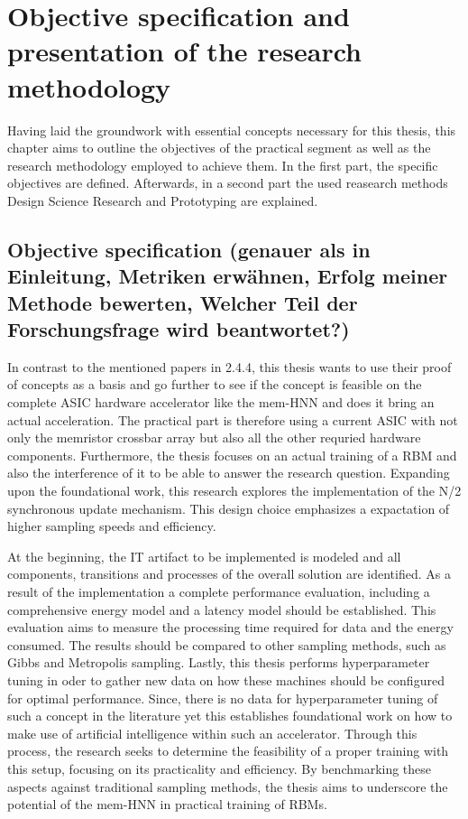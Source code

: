 \chapter{Objective specification and presentation of the research methodology}


Having laid the groundwork with essential concepts necessary for this thesis,
this chapter aims to outline the objectives of the practical segment as well as the research methodology employed to achieve them.
In the first part, the specific objectives are defined. 
Afterwards, in a second part the used reasearch methods Design Science Research and Prototyping are explained.






\section{Objective specification (genauer als in Einleitung, Metriken erwähnen, Erfolg meiner Methode bewerten, Welcher Teil der Forschungsfrage wird beantwortet?)}

In contrast to the mentioned papers in 2.4.4, this thesis wants to use their proof of concepts as a basis and go further to see if the concept
is feasible on the complete \ac{ASIC} hardware accelerator like the \ac{mem-HNN} and does it bring an actual acceleration.
The practical part is therefore using a current \ac{ASIC} with not only the memristor crossbar array but also all the other requried hardware components.
Furthermore, the thesis focuses on an actual training of a \ac{RBM} and also the interference of it to be able to answer the research question.
Expanding upon the foundational work, this research explores the implementation of the N/2 synchronous update mechanism.
This design choice emphasizes a expactation of higher sampling speeds and efficiency.

At the beginning, the \ac{IT} artifact to be implemented is modeled and all components, transitions and processes of the overall solution are identified.
As a result of the implementation a complete performance evaluation, including a comprehensive energy model and a latency model should be established.
This evaluation aims to measure the processing time required for data and the energy consumed.
The results should be compared to other sampling methods, such as Gibbs and Metropolis sampling.
Lastly, this thesis performs hyperparameter tuning in oder to gather new data on how these machines should be configured for optimal performance.
Since, there is no data for hyperparameter tuning of such a concept in the literature yet this establishes foundational work on how to make use of artificial intelligence within such an accelerator.
Through this process, the research seeks to determine the feasibility of a proper training with this setup, focusing on its practicality and efficiency.
By benchmarking these aspects against traditional sampling methods, the thesis aims to underscore the potential of the \ac{mem-HNN} 
in practical training of \ac{RBM}s.


